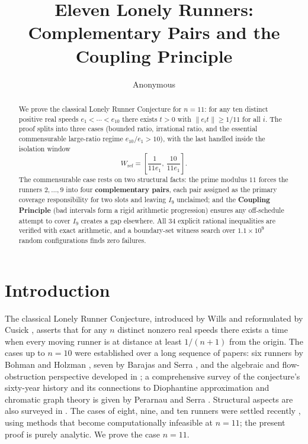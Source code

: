 \documentclass[12pt]{article}
\title{Eleven Lonely Runners: Complementary Pairs and the Coupling Principle}
\author[1]{Anonymous}
\affil[1]{%
Anonymous Institution

\email{anonymous@example.com}%
}
\begin{document}
\maketitle

\begin{abstract}

We prove the classical Lonely Runner Conjecture for $n=11$: for any ten distinct positive
real speeds $e_1<\cdots<e_{10}$ there exists $t>0$ with $\|e_i t\|\ge 1/11$ for all $i$.
The proof splits into three cases (bounded ratio, irrational ratio, and the essential
commensurable large-ratio regime $e_{10}/e_1>10$), with the last handled inside the
isolation window
\[
W_{\mathrm{ref}} = \left[\frac{1}{11e_1},\,\frac{10}{11e_1}\right].
\]
The commensurable case rests on two structural facts: the prime modulus $11$ forces the
runners $2,\ldots,9$ into four \textbf{complementary pairs}, each pair assigned as the primary
coverage responsibility for two slots and leaving $I_9$ unclaimed; and the \textbf{Coupling Principle} (bad intervals form a rigid arithmetic progression) ensures any off-schedule
attempt to cover $I_9$ creates a gap elsewhere.
All 34 explicit rational inequalities are verified with exact arithmetic, and a boundary-set
witness search over $1.1\times 10^9$ random configurations finds zero failures.

\end{abstract}



\section{Introduction}

The classical Lonely Runner Conjecture, introduced by Wills \cite{Wil67} and reformulated by
Cusick \cite{Cus73}, asserts that for any $n$ distinct nonzero real speeds there exists a
time when every moving runner is at distance at least $1/(n+1)$ from the origin. The cases
up to $n=10$ were established over a long sequence of papers: six runners by Bohman and
Holzman \cite{BH01}, seven by Barajas and Serra \cite{BS08}, and the algebraic and flow-obstruction
perspective developed in \cite{BGG+98}; a comprehensive survey of the conjecture's sixty-year
history and its connections to Diophantine approximation and chromatic graph theory is given by
Perarnau and Serra \cite{PS25}. Structural aspects are also surveyed in \cite{Tao18}. The cases
of eight, nine, and ten runners were settled recently \cite{Ros25a,Ros25b,Tra25}, using methods
that become computationally infeasible at $n=11$; the present proof is purely analytic. We prove
the case $n=11$.
\end{document}

